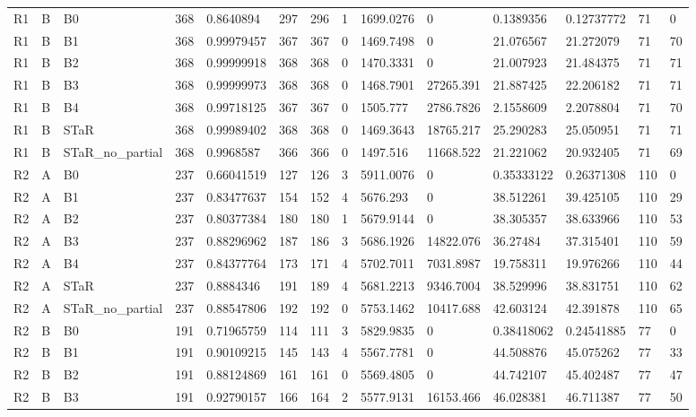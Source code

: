 \begin{longtable}{llllllllllllll}
R1 & B & B0 & 368 & 0.8640894 & 297 & 296 & 1 & 1699.0276 & 0 & 0.1389356 & 0.12737772 & 71 & 0 \\
R1 & B & B1 & 368 & 0.99979457 & 367 & 367 & 0 & 1469.7498 & 0 & 21.076567 & 21.272079 & 71 & 70 \\
R1 & B & B2 & 368 & 0.99999918 & 368 & 368 & 0 & 1470.3331 & 0 & 21.007923 & 21.484375 & 71 & 71 \\
R1 & B & B3 & 368 & 0.99999973 & 368 & 368 & 0 & 1468.7901 & 27265.391 & 21.887425 & 22.206182 & 71 & 71 \\
R1 & B & B4 & 368 & 0.99718125 & 367 & 367 & 0 & 1505.777 & 2786.7826 & 2.1558609 & 2.2078804 & 71 & 70 \\
R1 & B & STaR & 368 & 0.99989402 & 368 & 368 & 0 & 1469.3643 & 18765.217 & 25.290283 & 25.050951 & 71 & 71 \\
R1 & B & STaR\_no\_partial & 368 & 0.9968587 & 366 & 366 & 0 & 1497.516 & 11668.522 & 21.221062 & 20.932405 & 71 & 69 \\
R2 & A & B0 & 237 & 0.66041519 & 127 & 126 & 3 & 5911.0076 & 0 & 0.35333122 & 0.26371308 & 110 & 0 \\
R2 & A & B1 & 237 & 0.83477637 & 154 & 152 & 4 & 5676.293 & 0 & 38.512261 & 39.425105 & 110 & 29 \\
R2 & A & B2 & 237 & 0.80377384 & 180 & 180 & 1 & 5679.9144 & 0 & 38.305357 & 38.633966 & 110 & 53 \\
R2 & A & B3 & 237 & 0.88296962 & 187 & 186 & 3 & 5686.1926 & 14822.076 & 36.27484 & 37.315401 & 110 & 59 \\
R2 & A & B4 & 237 & 0.84377764 & 173 & 171 & 4 & 5702.7011 & 7031.8987 & 19.758311 & 19.976266 & 110 & 44 \\
R2 & A & STaR & 237 & 0.8884346 & 191 & 189 & 4 & 5681.2213 & 9346.7004 & 38.529996 & 38.831751 & 110 & 62 \\
R2 & A & STaR\_no\_partial & 237 & 0.88547806 & 192 & 192 & 0 & 5753.1462 & 10417.688 & 42.603124 & 42.391878 & 110 & 65 \\
R2 & B & B0 & 191 & 0.71965759 & 114 & 111 & 3 & 5829.9835 & 0 & 0.38418062 & 0.24541885 & 77 & 0 \\
R2 & B & B1 & 191 & 0.90109215 & 145 & 143 & 4 & 5567.7781 & 0 & 44.508876 & 45.075262 & 77 & 33 \\
R2 & B & B2 & 191 & 0.88124869 & 161 & 161 & 0 & 5569.4805 & 0 & 44.742107 & 45.402487 & 77 & 47 \\
R2 & B & B3 & 191 & 0.92790157 & 166 & 164 & 2 & 5577.9131 & 16153.466 & 46.028381 & 46.711387 & 77 & 50 \\

\end{longtable}
